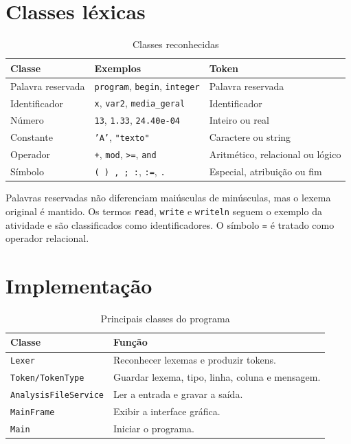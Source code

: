 \documentclass[12pt,a4paper]{article}
\begin{document}
\section{Classes léxicas}

\begin{table}[H]
\centering
\caption{Classes reconhecidas}
\small
\begin{tabularx}{\textwidth}{p{3.1cm}Y Y}
\toprule
\textbf{Classe} & \textbf{Exemplos} & \textbf{Token} \\
\midrule
Palavra reservada & \texttt{program}, \texttt{begin}, \texttt{integer} & Palavra reservada \\
Identificador & \texttt{x}, \texttt{var2}, \texttt{media\_geral} & Identificador \\
Número & \texttt{13}, \texttt{1.33}, \texttt{24.40e-04} & Inteiro ou real \\
Constante & \texttt{'A'}, \texttt{"texto"} & Caractere ou string \\
Operador & \texttt{+}, \texttt{mod}, \texttt{>=}, \texttt{and} & Aritmético, relacional ou lógico \\
Símbolo & \texttt{( ) , ; :}, \texttt{:=}, \texttt{.} & Especial, atribuição ou fim \\
\bottomrule
\end{tabularx}
\end{table}

Palavras reservadas não diferenciam maiúsculas de minúsculas, mas o lexema original é mantido. Os termos \texttt{read}, \texttt{write} e \texttt{writeln} seguem o exemplo da atividade e são classificados como identificadores. O símbolo \texttt{=} é tratado como operador relacional.

\section{Implementação}

\begin{table}[H]
\centering
\caption{Principais classes do programa}
\small
\begin{tabularx}{\textwidth}{p{4cm}Y}
\toprule
\textbf{Classe} & \textbf{Função} \\
\midrule
\texttt{Lexer} & Reconhecer lexemas e produzir tokens. \\
\texttt{Token/TokenType} & Guardar lexema, tipo, linha, coluna e mensagem. \\
\texttt{AnalysisFileService} & Ler a entrada e gravar a saída. \\
\texttt{MainFrame} & Exibir a interface gráfica. \\
\texttt{Main} & Iniciar o programa. \\
\bottomrule
\end{tabularx}
\end{table}
\end{document}
